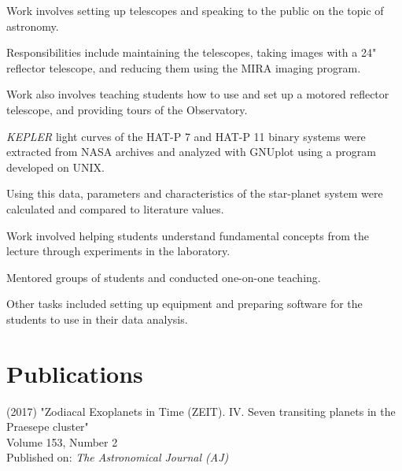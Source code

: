 \documentclass[]{deedy-resume-openfont}
\begin{document}
\begin{minipage}[t]{0.9\textwidth}
\begin{tightemize}
\item Work involves setting up telescopes and speaking to the public on the topic of astronomy. \item Responsibilities include maintaining the telescopes, taking images with a 24" reflector telescope, and reducing them using the MIRA imaging program. \item Work also involves teaching students how to use and set up a motored reflector telescope, and providing tours of the Observatory.\end{tightemize}
\sectionsep

\begin{tightemize}
\item {\it KEPLER} light curves of the HAT-P 7 and HAT-P 11 binary systems were extracted from NASA archives and analyzed with GNUplot using a program developed on UNIX. \item Using this data, parameters and characteristics of the star-planet system were calculated and compared to literature values.\end{tightemize}
\sectionsep

\begin{tightemize}
\item Work involved helping students understand fundamental concepts from the lecture through experiments in the laboratory. \item Mentored groups of students and conducted one-on-one teaching. \item Other tasks included setting up equipment and preparing software for the students to use in their data analysis.\end{tightemize}
\sectionsep


\section{Publications}
 (2017) "Zodiacal Exoplanets in Time (ZEIT). IV. Seven transiting planets in the Praesepe cluster" \\ Volume 153, Number 2     \\
Published on: {\it The Astronomical Journal (AJ)}
\\
\sectionsep


\end{minipage}
\end{document}
